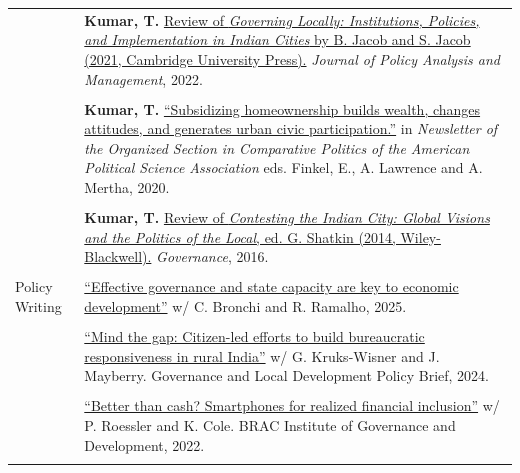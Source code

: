 \documentclass[letterpaper, 10.5pt]{article}
\begin{document}
\begin{longtable}{p{1.5in}p{5in}}
& \textbf{Kumar, T.} \href{https://doi.org/10.1002/pam.22390}{Review of \textit{Governing Locally: Institutions, Policies, and Implementation in Indian Cities} by B. Jacob and S. Jacob (2021, Cambridge University Press).}  \textit{Journal of Policy Analysis and Management}, 2022. \\


& \\



& \textbf{Kumar, T.}
 \href{https://www.comparativepoliticsnewsletter.org/wp-content/uploads/2020/05/Spring-Newsletter-2020.pdf}{``Subsidizing homeownership builds wealth, changes attitudes, and generates urban civic participation.''} in \textit{Newsletter of the Organized Section in Comparative Politics of the American Political Science Association} eds. Finkel, E., A. Lawrence and A. Mertha, 2020. \\
&\\
& \textbf{Kumar, T.} \href{http://onlinelibrary.wiley.com/doi/10.1111/gove.12241/abstract}{Review of \textit{Contesting the Indian City: Global Visions and the Politics of the Local}, ed. G. Shatkin (2014, Wiley-Blackwell).} \textit{Governance}, 2016. 

\\

& \\


Policy Writing &

\href{https://blogs.worldbank.org/en/governance/effective-governance-and-state-capacity-are-key-to-economic-deve}{``Effective governance and state capacity are key to economic development''} w/ C. Bronchi and R. Ramalho, 2025.\\

& \\

&\href{https://gld.gu.se/media/tptdfltw/policy-brief-no26.pdf}{``Mind the gap: Citizen-led efforts to build bureaucratic
responsiveness in rural India''} w/ G. Kruks-Wisner and J. Mayberry. Governance and Local Development Policy Brief, 2024. \\

& \\

& \href{https://bigd.bracu.ac.bd/better-than-cash-smartphones-for-realized-financial-inclusion/}{``Better than cash? Smartphones for realized financial inclusion''} w/ P. Roessler and K. Cole. BRAC Institute of Governance and Development, 2022. \\
&\\


\end{longtable}
\end{document}
